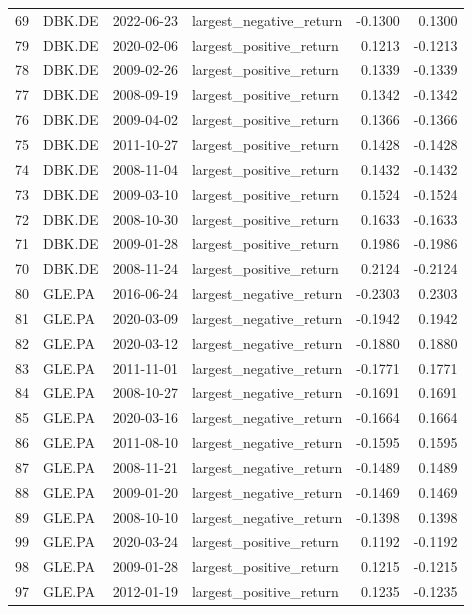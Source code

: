 \begin{table}
\begin{tabular}{llllrr}
69 & DBK.DE & 2022-06-23 & largest_negative_return & -0.1300 & 0.1300 \\
79 & DBK.DE & 2020-02-06 & largest_positive_return & 0.1213 & -0.1213 \\
78 & DBK.DE & 2009-02-26 & largest_positive_return & 0.1339 & -0.1339 \\
77 & DBK.DE & 2008-09-19 & largest_positive_return & 0.1342 & -0.1342 \\
76 & DBK.DE & 2009-04-02 & largest_positive_return & 0.1366 & -0.1366 \\
75 & DBK.DE & 2011-10-27 & largest_positive_return & 0.1428 & -0.1428 \\
74 & DBK.DE & 2008-11-04 & largest_positive_return & 0.1432 & -0.1432 \\
73 & DBK.DE & 2009-03-10 & largest_positive_return & 0.1524 & -0.1524 \\
72 & DBK.DE & 2008-10-30 & largest_positive_return & 0.1633 & -0.1633 \\
71 & DBK.DE & 2009-01-28 & largest_positive_return & 0.1986 & -0.1986 \\
70 & DBK.DE & 2008-11-24 & largest_positive_return & 0.2124 & -0.2124 \\
80 & GLE.PA & 2016-06-24 & largest_negative_return & -0.2303 & 0.2303 \\
81 & GLE.PA & 2020-03-09 & largest_negative_return & -0.1942 & 0.1942 \\
82 & GLE.PA & 2020-03-12 & largest_negative_return & -0.1880 & 0.1880 \\
83 & GLE.PA & 2011-11-01 & largest_negative_return & -0.1771 & 0.1771 \\
84 & GLE.PA & 2008-10-27 & largest_negative_return & -0.1691 & 0.1691 \\
85 & GLE.PA & 2020-03-16 & largest_negative_return & -0.1664 & 0.1664 \\
86 & GLE.PA & 2011-08-10 & largest_negative_return & -0.1595 & 0.1595 \\
87 & GLE.PA & 2008-11-21 & largest_negative_return & -0.1489 & 0.1489 \\
88 & GLE.PA & 2009-01-20 & largest_negative_return & -0.1469 & 0.1469 \\
89 & GLE.PA & 2008-10-10 & largest_negative_return & -0.1398 & 0.1398 \\
99 & GLE.PA & 2020-03-24 & largest_positive_return & 0.1192 & -0.1192 \\
98 & GLE.PA & 2009-01-28 & largest_positive_return & 0.1215 & -0.1215 \\
97 & GLE.PA & 2012-01-19 & largest_positive_return & 0.1235 & -0.1235 \\

\end{tabular}
\end{table}
